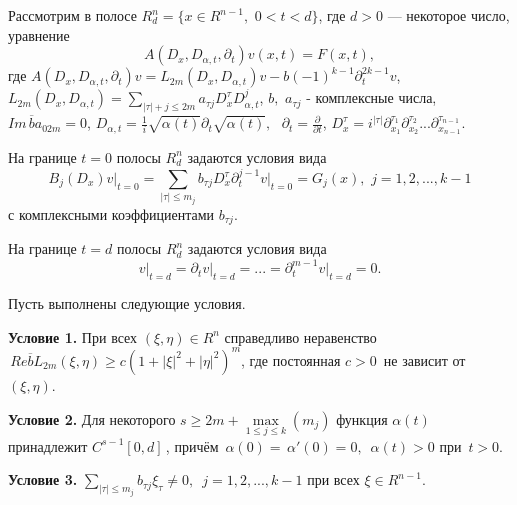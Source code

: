 Рассмотрим в полосе $R_d^n = \{x \in R^{n - 1},\,\,0 < t < d\}$, где $d >
0$ --- некоторое число, уравнение
\begin{equation}
\label{eq4500}
A(D_x ,D_{\alpha ,t} ,\partial _t )v(x,t) = F(x,t),
\end{equation}
где
$A(D_x ,D_{\alpha ,t} ,\partial _t )v = L_{2m} (D_x ,D_{\alpha ,t} )v -
b( - 1)^{k - 1}\partial _t^{2k - 1} v$,
\linebreak
$L_{2m} (D_x ,D_{\alpha ,t} ) =
\sum\limits_{\left| \tau \right| + j \leqslant 2m} {a_{\tau j} D_x^\tau D_{\alpha
,t}^j } $, $b,\,\,a_{\tau j} $ - комплексные числа, $Im\,\overline b a_{02m}
= 0$, $D_{\alpha ,t} = \frac{1}{i}\sqrt {\alpha (t)} \partial _t \sqrt
{\alpha (t)} ,\,\,\,\,\partial _t = \frac{\partial }{\partial t}$, $D_x^\tau
= i^{\left| \tau \right|}\partial _{x_1 }^{\tau _1 } \partial _{x_2 }^{\tau
_2 } ...\partial _{x_{n - 1} }^{\tau _{n - 1} } $.

На границе $t = 0$ полосы $R_d^n $ задаются условия вида
\begin{equation}
\label{eq4501}
B_j (D_x )\left. v \right|_{t = 0} = \!\!\! \sum\limits_{\left| \tau \right| \leqslant
m_j } {b_{\tau j} D_x^\tau \partial _t^{j - 1} \left. v \right|_{t = 0} =
G_j (x)} ,\,\,j = 1,2,...,k - 1
\end{equation}
с комплексными коэффициентами $b_{\tau j} $.

На границе $t = d$ полосы $R_d^n $ задаются условия вида
\begin{equation}
\label{eq4502}
\left. v \right|_{t = d} = \partial _t \left. v \right|_{t = d} = ... =
\partial _t^{m - 1} \left. v \right|_{t = d} = 0.
\end{equation}

Пусть выполнены следующие условия.

\textbf{Условие 1.} При всех $(\xi ,\eta ) \in R^n$ справедливо неравенство
$\,Re\overline b L_{2m} (\xi ,\eta ) \geqslant c(1 + \left| \xi \right|^2 + \left|
\eta \right|^2)^m$, где постоянная $c > 0\,$ не зависит от $(\xi ,\eta )$.

\textbf{Условие 2.} Для некоторого $s \geqslant 2m + \mathop {\max }\limits_{1 \leqslant
j \leqslant k} (m_j )$ функция $\alpha (t)$ принадлежит $C^{s - 1}[0,d]\,$, причём
$\,\alpha (0) = \,\alpha '(0) = 0,\,\,\,\alpha (t) > 0$ при $\,t > 0$.

\textbf{Условие 3.}
$\sum\limits_{\left| \tau \right| \leqslant m_j } {b_{\tau
j} \xi _\tau \ne 0,\,\,} \,j = 1,2,...,k - 1$ при всех $\xi \in R^{n - 1}$.

